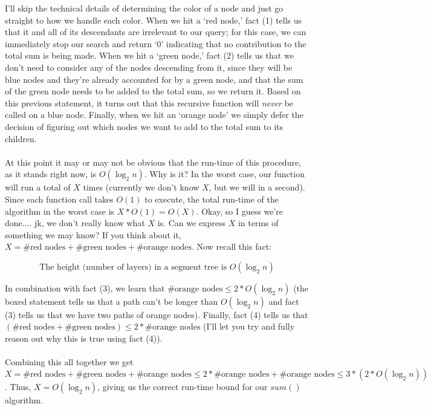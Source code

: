 \documentclass[11pt]{article}
\theoremstyle{plain}
\theoremstyle{definition}
\begin{document}
\noindent I'll skip the technical details of determining the color of a node and just go straight to how we handle each color. When we hit a `red node,' fact (1) tells us that it and all of its descendants are irrelevant to our query; for this case, we can immediately stop our search and return `0' indicating that no contribution to the total sum is being made. When we hit a `green node,' fact (2) tells us that we don't need to consider any of the nodes descending from it, since they will be blue nodes and they're already accounted for by a green node, and that the sum of the green node needs to be added to the total sum, so we return it. Based on this previous statement, it turns out that this recursive function will \emph{never} be called on a blue node. Finally, when we hit an `orange node' we simply defer the decision of figuring out which nodes we want to add to the total sum to its children.
\\\\
At this point it may or may not be obvious that the run-time of this procedure, as it stands right now, is $O(\log_2{n})$. Why is it? In the worst case, our function will run a total of $X$ times (currently we don't know $X$, but we will in a second). Since each function call takes $O(1)$ to execute, the total run-time of the algorithm in the worst case is $X*O(1) = O(X)$. Okay, so I guess we're done.... jk, we don't really know what $X$ is. Can we express $X$ in terms of something we may know? If you think about it, $X = \text{\#red nodes} + \text{\#green nodes} + \text{\#orange nodes}$. Now recall this fact:

$$\boxed{\text{The height (number of layers) in a segment tree is } O(\log_2{n})}$$

\noindent In combination with fact (3), we learn that $\text{\#orange nodes} \leq 2*O(\log_2{n})$ (the boxed statement tells us that a path can't be longer than $O(\log_2{n})$ and fact (3) tells us that we have two paths of orange nodes). Finally, fact (4) tells us that $(\text{\#red nodes} + \text{\#green nodes}) \leq 2*\text{\#orange nodes}$ (I'll let you try and fully reason out why this is true using fact (4)).
\\\\
Combining this all together we get $X = \text{\#red nodes} + \text{\#green nodes} + \text{\#orange nodes} \leq 2*\text{\#orange nodes}  + \text{\#orange nodes} \leq 3*(2*O(\log_2{n}))$. Thus, $X = O(\log_2{n})$, giving us the correct run-time bound for our $sum()$ algorithm.
\end{document}
